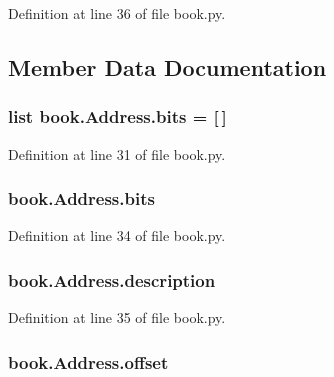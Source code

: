 Definition at line 36 of file book.\+py.



\subsection{Member Data Documentation}
\subsubsection[{\texorpdfstring{bits}{bits}}]{\setlength{\rightskip}{0pt plus 5cm}list book.\+Address.\+bits = \mbox{[}$\,$\mbox{]}\hspace{0.3cm}{\ttfamily [static]}}\hypertarget{classbook_1_1_address_a5040cf9c4f11a07654d0d621252114aa}{}\label{classbook_1_1_address_a5040cf9c4f11a07654d0d621252114aa}


Definition at line 31 of file book.\+py.

\subsubsection[{\texorpdfstring{bits}{bits}}]{\setlength{\rightskip}{0pt plus 5cm}book.\+Address.\+bits}\hypertarget{classbook_1_1_address_abf067b8c097b85a8886928c57e7e7d4f}{}\label{classbook_1_1_address_abf067b8c097b85a8886928c57e7e7d4f}


Definition at line 34 of file book.\+py.

\subsubsection[{\texorpdfstring{description}{description}}]{\setlength{\rightskip}{0pt plus 5cm}book.\+Address.\+description}\hypertarget{classbook_1_1_address_aca6b57c6a0681dfb787ae74d70cf3373}{}\label{classbook_1_1_address_aca6b57c6a0681dfb787ae74d70cf3373}


Definition at line 35 of file book.\+py.

\subsubsection[{\texorpdfstring{offset}{offset}}]{\setlength{\rightskip}{0pt plus 5cm}book.\+Address.\+offset}\hypertarget{classbook_1_1_address_a1df9c6785a8eb9214ec73703b932c43f}{}\label{classbook_1_1_address_a1df9c6785a8eb9214ec73703b932c43f}


